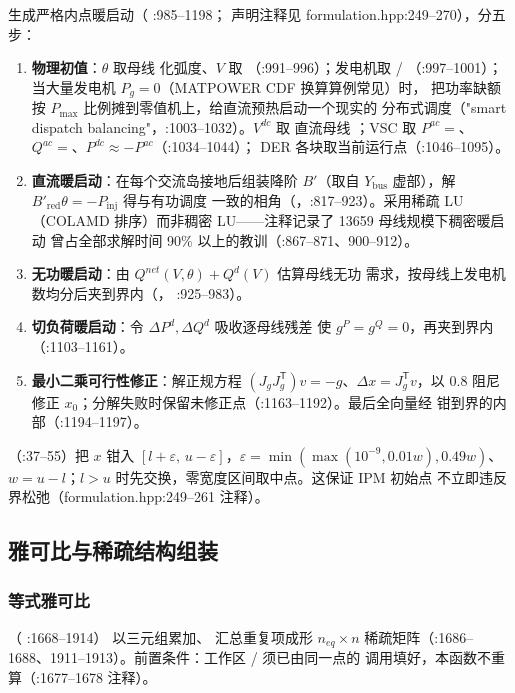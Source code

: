  生成严格内点暖启动（
\allowbreak :985--1198；
声明注释见 formulation.hpp:249--270），分五步：

\begin{enumerate}
\item \textbf{物理初值}：$\theta$ 取母线  化弧度、$V$ 取
  （:991--996）；发电机取 /
  （:997--1001）；当大量发电机 $P_g=0$（MATPOWER CDF 换算算例常见）时，
  把功率缺额按 $P_{\max}$ 比例摊到零值机上，给直流预热启动一个现实的
  分布式调度（"smart dispatch balancing"，:1003--1032）。$V^{dc}$ 取
  直流母线 ；VSC 取 $P^{ac}=$、
  $Q^{ac}=$、$P^{dc}\approx-P^{ac}$（:1034--1044）；
  DER 各块取当前运行点（:1046--1095）。
\item \textbf{直流暖启动}：在每个交流岛接地后组装降阶 $B'$（取自
  $Y_{\mathrm{bus}}$ 虚部），解 $B'_{\mathrm{red}}\theta=-P_{\mathrm{inj}}$ 得与有功调度
  一致的相角（，:817--923）。采用稀疏 LU
  （COLAMD 排序）而非稠密 LU——注释记录了 13659 母线规模下稠密暖启动
  曾占全部求解时间 90\% 以上的教训（:867--871、900--912）。
\item \textbf{无功暖启动}：由 $Q^{net}(V,\theta)+Q^d(V)$ 估算母线无功
  需求，按母线上发电机数均分后夹到界内（，
  :925--983）。
\item \textbf{切负荷暖启动}：令 $\Delta P^d,\Delta Q^d$ 吸收逐母线残差
  使 $g^P=g^Q=0$，再夹到界内（:1103--1161）。
\item \textbf{最小二乘可行性修正}：解正规方程
  $(J_gJ_g^{\mathsf{T}})v=-g$、$\Delta x=J_g^{\mathsf{T}}v$，以 0.8 阻尼
  修正 $x_0$；分解失败时保留未修正点（:1163--1192）。最后全向量经
   钳到界的内部（:1194--1197）。
\end{enumerate}

（:37--55）把 $x$ 钳入
$[l+\varepsilon,\,u-\varepsilon]$，$\varepsilon=\min(\max(10^{-9},0.01w),
0.49w)$、$w=u-l$；$l>u$ 时先交换，零宽度区间取中点。这保证 IPM 初始点
不立即违反界松弛（formulation.hpp:249--261 注释）。

\subsection{雅可比与稀疏结构组装}

\subsubsection*{等式雅可比}
（
:1668--1914）
以三元组累加、 汇总重复项成形
$n_{eq}\times n$ 稀疏矩阵（:1686--1688、1911--1913）。前置条件：工作区
/ 须已由同一点的
 调用填好，本函数不重算（:1677--1678
注释）。

